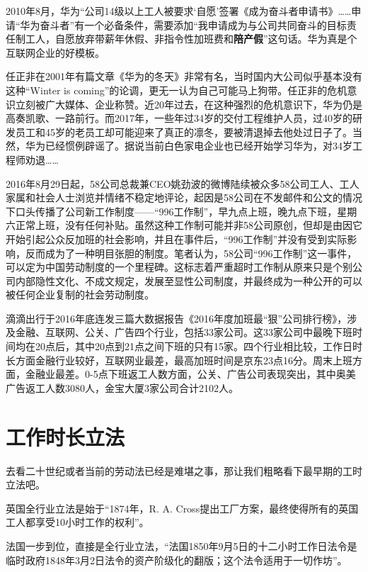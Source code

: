 2010年8月，华为“公司14级以上工人被要求`自愿'签署《成为奋斗者申请书》……申请“华为奋斗者”有一个必备条件，需要添加“我申请成为与公司共同奋斗的目标责任制工人，自愿放弃带薪年休假、非指令性加班费和\textbf{陪产假}”这句话。\cite{huaweifendou}华为真是个互联网企业的好模板。

任正非在2001年有篇文章《华为的冬天》非常有名，当时国内大公司似乎基本没有这种“Winter is coming”的论调，更无一认为自己可能马上狗带。任正非的危机意识立刻被广大媒体、企业称赞。近20年过去，在这种强烈的危机意识下，华为仍是高奏凯歌、一路前行。而2017年，一些年过34岁的交付工程维护人员，过40岁的研发员工和45岁的老员工却可能迎来了真正的凛冬，要被清退掉去他处过日子了。当然，华为已经惯例辟谣了。据说当前白色家电企业也已经开始学习华为，对34岁工程师劝退……

2016年8月29日起，58公司总裁兼CEO姚劲波的微博陆续被众多58公司工人、工人家属和社会人士浏览并情绪不稳定地评论\cite{tai58}，起因是58公司在不发邮件和公文的情况下口头传播了公司新工作制度——“996工作制”，早九点上班，晚九点下班，星期六正常上班，没有任何补贴。虽然这种工作制可能并非58公司原创，但却是由因它开始引起公众反加班的社会影响，并且在事件后，“996工作制”并没有受到实际影响，反而成为了一种明目张胆的制度。笔者认为，58公司“996工作制”这一事件，可以定为中国劳动制度的一个里程碑。这标志着严重超时工作制从原来只是个别公司内部隐性文化、不成文规定，发展至显性公司制度，并最终成为一种公开的可以被任何企业复制的社会劳动制度。

滴滴出行于2016年底连发三篇大数据报告《2016年度加班最“狠”公司排行榜》\cite{zuihen}，涉及金融、互联网、公关、广告四个行业，包括33家公司。这33家公司中最晚下班时间均在20点后，其中20点到21点之间下班的只有15家。四个行业相比较，工作日时长方面金融行业较好，互联网业最差，最高加班时间是京东23点16分。周末上班方面，金融业最差。0-5点下班返工人数方面，公关、广告公司表现突出，其中奥美广告返工人数3080人，金宝大厦3家公司合计2102人。

\section{工作时长立法}

去看二十世纪或者当前的劳动法已经是难堪之事，那让我们粗略看下最早期的工时立法吧。

英国全行业立法是始于“1874年，R. A. Cross提出工厂方案，最终使得所有的英国工人都享受10小时工作的权利”。

法国一步到位，直接是全行业立法，“法国1850年9月5日的十二小时工作日法令是临时政府1848年3月2日法令的资产阶级化的翻版；这个法令适用于一切作坊”。

